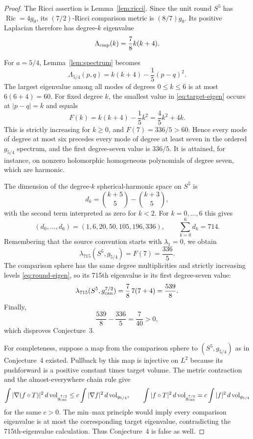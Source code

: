 \documentclass[10pt]{article}
\newcommand{\Ric}{\operatorname{Ric}}
\newcommand{\vol}{\operatorname{vol}}
\begin{document}
\begin{proof}
The Ricci assertion is Lemma~\ref{lem:ricci}.  Since the unit round $S^5$ has
$\Ric=4g_0$, its $(7/2)$-Ricci comparison metric is $(8/7)g_0$.  Its positive
Laplacian therefore has degree-$k$ eigenvalue
\begin{equation}\label{eq:round-eigen}
 \Lambda_{\rm cmp}(k)=\frac78 k(k+4).
\end{equation}

For $a=5/4$, Lemma~\ref{lem:spectrum} becomes
\begin{equation}\label{eq:target-eigen}
 \Lambda_{5/4}(p,q)=k(k+4)-\frac15(p-q)^2.
\end{equation}
The largest eigenvalue among all modes of degrees $0\leq k\leq6$ is at most
$6(6+4)=60$.  For fixed degree $k$, the smallest value in
\eqref{eq:target-eigen} occurs at $|p-q|=k$ and equals
\[
 F(k)=k(k+4)-\frac15k^2=\frac45k^2+4k.
\]
This is strictly increasing for $k\geq0$, and $F(7)=336/5>60$.  Hence every
mode of degree at most six precedes every mode of degree at least seven in the
ordered $g_{5/4}$ spectrum, and the first degree-seven value is $336/5$.  It
is attained, for instance, on nonzero holomorphic homogeneous polynomials of
degree seven, which are harmonic.

The dimension of the degree-$k$ spherical-harmonic space on $S^5$ is
\[
 d_k=\binom{k+5}{5}-\binom{k+3}{5},
\]
with the second term interpreted as zero for $k<2$.  For $k=0,\ldots,6$ this
gives
\[
 (d_0,\ldots,d_6)=(1,6,20,50,105,196,336),\qquad
 \sum_{k=0}^6d_k=714.
\]
Remembering that the source convention starts with $\lambda_1=0$, we obtain
\[
 \lambda_{715}(S^5,g_{5/4})=F(7)=\frac{336}{5}.
\]
The comparison sphere has the same degree multiplicities and strictly
increasing levels \eqref{eq:round-eigen}, so its 715th eigenvalue is its first
degree-seven value:
\[
 \lambda_{715}(S^5,g_{\rm can}^{7/2})
 =\frac78\,7(7+4)=\frac{539}{8}.
\]
Finally,
\[
 \frac{539}{8}-\frac{336}{5}=\frac7{40}>0,
\]
which disproves Conjecture~3.

For completeness, suppose a map from the comparison sphere to
$(S^5,g_{5/4})$ as in Conjecture~4 existed.  Pullback by this map is injective
on $L^2$ because its pushforward is a positive constant times target volume.
The metric contraction and the almost-everywhere chain rule give
\[
 \int |\nabla(f\circ T)|^2\,d\vol_{g_{\rm can}^{7/2}}
 \leq c\int|\nabla f|^2\,d\vol_{g_{5/4}},\qquad
 \int |f\circ T|^2\,d\vol_{g_{\rm can}^{7/2}}
 =c\int|f|^2\,d\vol_{g_{5/4}}
\]
for the same $c>0$.  The min--max principle would imply every comparison
eigenvalue is at most the corresponding target eigenvalue, contradicting the
715th-eigenvalue calculation.  Thus Conjecture~4 is false as well.
\end{proof}
\end{document}
